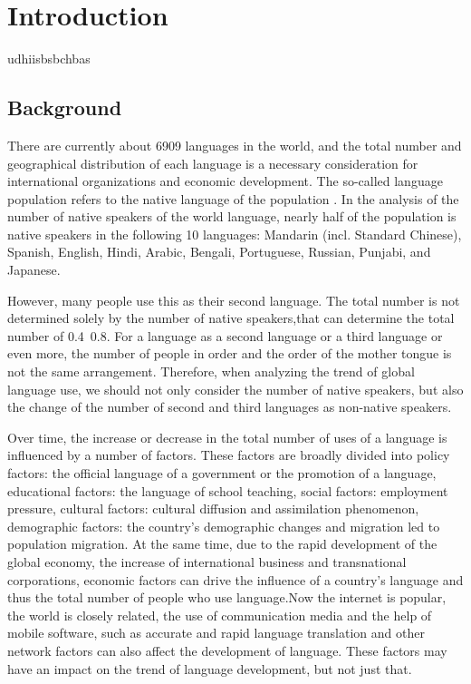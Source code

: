 \section{Introduction}
udhiisbsbchbas
\subsection{Background}
\noindent
There are currently about 6909 languages in the world, and the total number and geographical distribution of each language is a necessary consideration for international organizations and economic development. The so-called language population refers to the native language of the population . In the analysis of the number of native speakers of the world language, nearly half of the population is native speakers in the following 10 languages: Mandarin (incl. Standard Chinese), Spanish, English, Hindi, Arabic, Bengali, Portuguese, Russian, Punjabi, and Japanese.

However, many people use this as their second language. The total number is not determined solely by the number of native speakers,that can determine the total number of 0.4~0.8. For a language as a second language or a third language or even more, the number of people in order and the order of the mother tongue is not the same arrangement. Therefore, when analyzing the trend of global language use, we should not only consider the number of native speakers, but also the change of the number of  second and third languages as non-native speakers. 

Over time, the increase or decrease in the total number of uses of a language is influenced by a number of factors. These factors are broadly divided into policy factors: the official language of a government or the promotion of a language, educational factors: the language of school teaching, social factors: employment pressure, cultural factors: cultural diffusion and assimilation phenomenon, demographic factors: the country's demographic changes and migration led to population migration. At the same time, due to the rapid development of the global economy, the increase of international business and transnational corporations, economic factors can drive the influence of a country's language and thus the total number of people who use language.Now the internet is popular, the world is closely related, the use of communication media and the help of mobile software, such as accurate and rapid language translation and other network factors can also affect the development of language. These factors may have an impact on the trend of language development, but not just that. 
